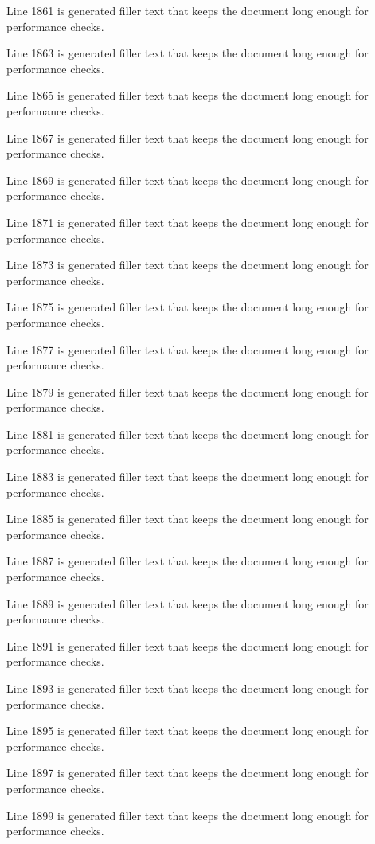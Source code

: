 Line 1861 is generated filler text that keeps the document long enough for performance checks.

Line 1863 is generated filler text that keeps the document long enough for performance checks.

Line 1865 is generated filler text that keeps the document long enough for performance checks.

Line 1867 is generated filler text that keeps the document long enough for performance checks.

Line 1869 is generated filler text that keeps the document long enough for performance checks.

Line 1871 is generated filler text that keeps the document long enough for performance checks.

Line 1873 is generated filler text that keeps the document long enough for performance checks.

Line 1875 is generated filler text that keeps the document long enough for performance checks.

Line 1877 is generated filler text that keeps the document long enough for performance checks.

Line 1879 is generated filler text that keeps the document long enough for performance checks.

Line 1881 is generated filler text that keeps the document long enough for performance checks.

Line 1883 is generated filler text that keeps the document long enough for performance checks.

Line 1885 is generated filler text that keeps the document long enough for performance checks.

Line 1887 is generated filler text that keeps the document long enough for performance checks.

Line 1889 is generated filler text that keeps the document long enough for performance checks.

Line 1891 is generated filler text that keeps the document long enough for performance checks.

Line 1893 is generated filler text that keeps the document long enough for performance checks.

Line 1895 is generated filler text that keeps the document long enough for performance checks.

Line 1897 is generated filler text that keeps the document long enough for performance checks.

Line 1899 is generated filler text that keeps the document long enough for performance checks.

